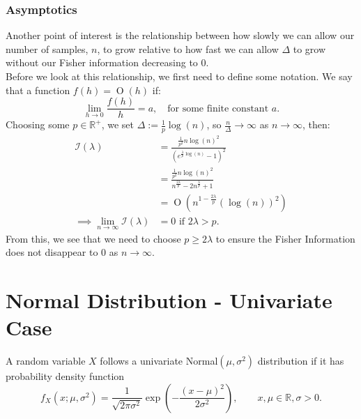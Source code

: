 \documentclass[11pt,a4,twosided,singlespacing,titlepagenumber=on,numbers=endperiod]{scrreprt}
\numberwithin{equation}{chapter} %
\theoremstyle{remark}
\DeclareMathOperator{\bigo}{O}
\begin{document}
\subsubsection{Asymptotics}
Another point of interest is the relationship between how slowly we can allow our number of samples, $n$, to grow relative to how fast we can allow $\Delta$ to grow without our Fisher information decreasing to 0. \\
Before we look at this relationship, we first need to define some notation. We say that a function $f(h) = \bigo(h)$ if:
\begin{equation*}
	\lim_{h \to 0} \frac{f(h)}{h} = a, \quad \text{for some finite constant } a.
\end{equation*}
Choosing some $p \in \mathbb{R}^+$, we set $\Delta:= \frac{1}{p}\log(n)$, so $\frac{n}{\Delta} \to \infty$ as $n \to \infty$, then:
\begin{equation*}
	\begin{aligned}
		\mathcal{I}(\lambda) &= \frac{\frac{1}{p^2} n \log(n)^2}{(e^{\frac{\lambda}{p} \log(n)} - 1)^2} \\
	    &= \frac{\frac{1}{p^2} n \log(n)^2}{n^{\frac{2 \lambda}{p}} - 2n^{\frac{\lambda}{p}} + 1} \\
	    &= \bigo \left( n^{1-\frac{2\lambda}{p}} (\log(n))^2 \right) \\
	    \implies \lim_{n \to \infty}\mathcal{I}(\lambda) &= 0 \text{ if } 2\lambda > p.
	\end{aligned}
\end{equation*}
From this, we see that we need to choose $p \geq 2\lambda$ to ensure the Fisher Information does not disappear to 0 as $n \to \infty$.

\newpage

\section{Normal Distribution - Univariate Case}

A random variable $X$ follows a univariate Normal$(\mu, \sigma^2)$ distribution if it has probability density function
\begin{equation}\label{eq:normal_pdf}
	f_X(x; \mu, \sigma^2) = \frac{1}{\sqrt{2 \pi \sigma^2}} \exp\left(-\frac{(x - \mu)^2}{2 \sigma^2} \right), \quad \quad x, \mu \in \mathbb{R}, \sigma > 0.
\end{equation}
\end{document}
